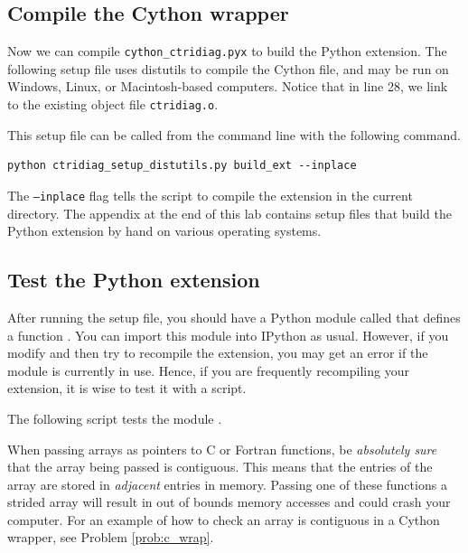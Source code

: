 \subsection*{Compile the Cython wrapper}

Now we can compile \texttt{cython\_ctridiag.pyx} to build the Python extension.
The following setup file uses distutils to compile the Cython file, and may be run on Windows, Linux, or Macintosh-based computers.
Notice that in line 28, we link to the existing object file \texttt{ctridiag.o}.



This setup file can be called from the command line with the following command.
\begin{lstlisting}[style=ShellInput]
python ctridiag_setup_distutils.py build_ext --inplace
\end{lstlisting}
The \texttt{--inplace} flag tells the script to compile the extension in the current directory.
The appendix at the end of this lab contains setup files that build the Python extension by hand on various operating systems.





\subsection*{Test the Python extension}
After running the setup file, you should have a Python module called  that defines a function .
You can import this module into IPython as usual.
However, if you modify  and then try to recompile the extension, you may get an error if the module is currently in use.
Hence, if you are frequently recompiling your extension, it is wise to test it  with a script.

The following script tests the module .



\begin{warn}
When passing arrays as pointers to C or Fortran functions, be \emph{absolutely sure} that the array being passed is contiguous.
This means that the entries of the array are stored in \emph{adjacent} entries in memory.
Passing one of these functions a strided array will result in out of bounds memory accesses and could crash your computer.
For an example of how to check an array is contiguous in a Cython wrapper, see Problem \ref{prob:c_wrap}.
\end{warn}



